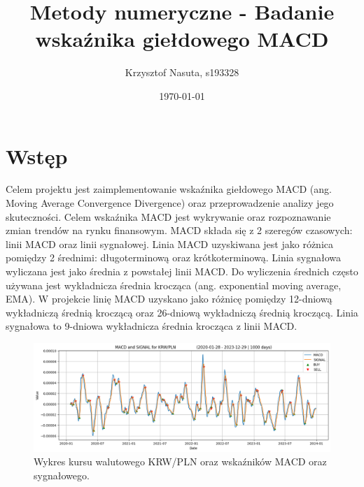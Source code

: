 \documentclass[12pt, a4paper]{article}
\title{Metody numeryczne - Badanie wskaźnika giełdowego MACD}
\author{Krzysztof Nasuta, s193328}
\date{\today}
\begin{document}
\maketitle

\section{Wstęp}
Celem projektu jest zaimplementowanie wskaźnika giełdowego MACD (ang. Moving Average Convergence Divergence)
oraz przeprowadzenie analizy jego skuteczności. Celem wskaźnika MACD jest wykrywanie oraz rozpoznawanie
zmian trendów na rynku finansowym. MACD składa się z 2 szeregów czasowych: linii MACD oraz linii sygnałowej.
Linia MACD uzyskiwana jest jako różnica pomiędzy 2 średnimi: długoterminową oraz krótkoterminową.
Linia sygnałowa wyliczana jest jako średnia z powstałej linii MACD. Do wyliczenia średnich często
używana jest wykładnicza średnia krocząca (ang. exponential moving average, EMA). W projekcie linię MACD uzyskano jako różnicę
pomiędzy 12-dniową wykładniczą średnią kroczącą oraz 26-dniową wykładniczą średnią kroczącą. Linia sygnałowa to 
9-dniowa wykładnicza średnia krocząca z linii MACD.


\begin{figure}[h]
    \centering
    \includegraphics[width=1.0\textwidth]{krw_pln_macd_signal.png}
    \caption{Wykres kursu walutowego KRW/PLN oraz wskaźników MACD oraz sygnałowego.}
    \label{fig:krw_pln_macd_signal}
\end{figure}
\end{document}
